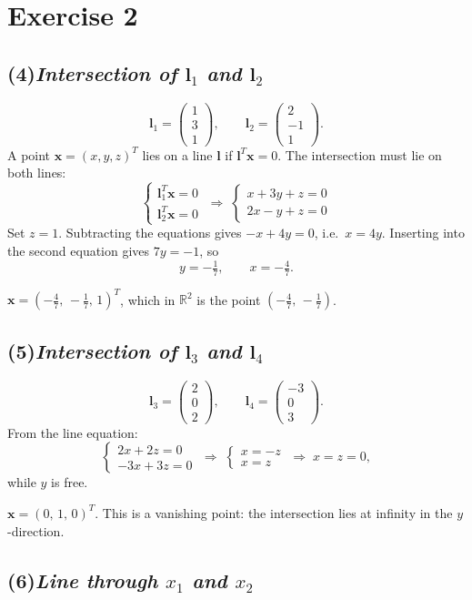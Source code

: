 \documentclass[11pt,a4paper]{article}
\newcommand{\vb}[1]{\mathbf{#1}}
\newcommand{\vect}[1]{
    \begin{pmatrix}#1
\end{pmatrix}}
\newcommand{\RR}{\mathbb{R}}
\newcommand{\exercise}[1]{
\section*{Exercise #1}}
\newcommand{\task}[2]{
\subsection*{#1\quad\normalfont\textit{#2}}}
\begin{document}
\exercise{2}

\task{(4)}{Intersection of $\vb{l}_1$ and $\vb{l}_2$}

\[
    \vb{l}_1 = \vect{1\\3\\1},\qquad \vb{l}_2 = \vect{2\\-1\\1}.
\]
A point $\vb{x}=(x,y,z)^T$ lies on a line $\vb{l}$ if $\vb{l}^T\vb{x}=0$.
The intersection must lie on both lines:
\[
    \begin{cases}
        \vb{l}_1^T\vb{x} = 0\\
        \vb{l}_2^T\vb{x} = 0
    \end{cases}
    \;\Longrightarrow\;
    \begin{cases}
        x + 3y + z = 0\\
        2x - y + z = 0
    \end{cases}
\]
Set $z=1$. Subtracting the equations gives $-x + 4y = 0$, i.e.\ $x = 4y$.
Inserting into the second equation gives $7y = -1$, so
\[
    y = -\tfrac{1}{7},\qquad x = -\tfrac{4}{7}.
\]
\begin{answer}
    $\vb{x} = \left(-\tfrac{4}{7},\,-\tfrac{1}{7},\,1\right)^T$,
    which in $\RR^2$ is the point
    $\left(-\tfrac{4}{7},\,-\tfrac{1}{7}\right)$.
\end{answer}

\task{(5)}{Intersection of $\vb{l}_3$ and $\vb{l}_4$}

\[
    \vb{l}_3 = \vect{2\\0\\2},\qquad \vb{l}_4 = \vect{-3\\0\\3}.
\]
From the line equation:
\[
    \begin{cases}
        2x + 2z = 0\\
        -3x + 3z = 0
    \end{cases}
    \;\Longrightarrow\;
    \begin{cases}
        x = -z\\
        x = z
    \end{cases}
    \;\Longrightarrow\; x = z = 0,
\]
while $y$ is free.
\begin{answer}
    $\vb{x} = (0,\,1,\,0)^T$. This is a vanishing point: the
    intersection lies at infinity in the $y$-direction.
\end{answer}

\task{(6)}{Line through $x_1$ and $x_2$}
\end{document}
